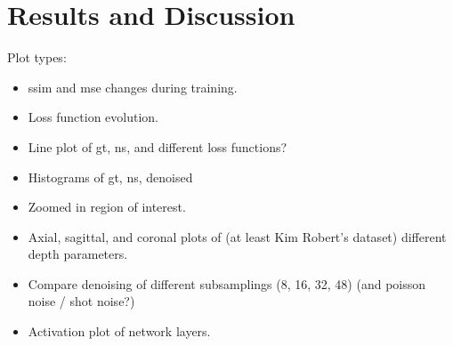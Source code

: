 \chapter{Results and Discussion}
\label{sec:results}
Plot types: 
\begin{itemize}
    \item \acrshort{ssim} and \acrshort{mse} changes during training.
    \item Loss function evolution.
    \item Line plot of gt, ns, and different loss functions?
    \item Histograms of gt, ns, denoised
    \item Zoomed in region of interest.
    \item Axial, sagittal, and coronal plots of (at least Kim Robert's dataset) different depth parameters.
    \item Compare denoising of different subsamplings (8, 16, 32, 48) (and poisson noise / shot noise?)
    \item Activation plot of network layers.
\end{itemize}